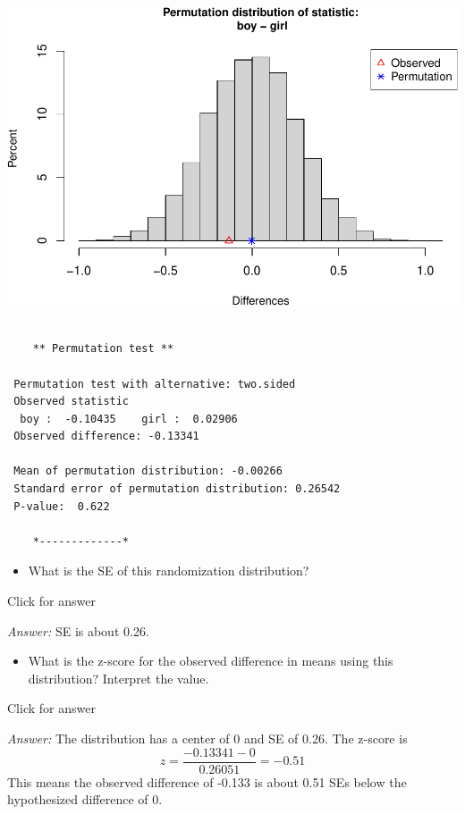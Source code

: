 \documentclass[
]{book}
\providecommand{\tightlist}{%
  \setlength{\itemsep}{0pt}\setlength{\parskip}{0pt}}
\begin{document}
\includegraphics[width=1\linewidth]{Class_Activity_14_files/figure-latex/unnamed-chunk-2-2}

\begin{verbatim}

    ** Permutation test **

 Permutation test with alternative: two.sided 
 Observed statistic
  boy :  -0.10435    girl :  0.02906 
 Observed difference: -0.13341 

 Mean of permutation distribution: -0.00266 
 Standard error of permutation distribution: 0.26542 
 P-value:  0.622 

    *-------------*
\end{verbatim}

\begin{itemize}
\tightlist
\item
  What is the SE of this randomization distribution?
\end{itemize}

Click for answer

\emph{Answer:} SE is about 0.26.

\begin{itemize}
\tightlist
\item
  What is the z-score for the observed difference in means using this distribution? Interpret the value.
\end{itemize}

Click for answer

\emph{Answer:} The distribution has a center of 0 and SE of 0.26. The z-score is
\[
z = \dfrac{-0.13341 - 0}{0.26051} = -0.51
\]
This means the observed difference of -0.133 is about 0.51 SEs below the hypothesized difference of 0.
\end{document}
